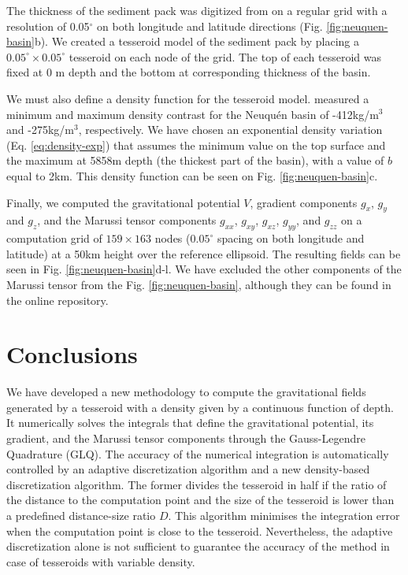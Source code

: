 \documentclass[extra, referee]{gji}
\begin{document}
The thickness of the sediment pack was digitized from \citet{Heine2007} on a regular
grid with a resolution of 0.05$^\circ$ on both longitude and latitude directions
(Fig. \ref{fig:neuquen-basin}b).
We created a tesseroid model of the sediment pack by placing a
$0.05^\circ \times 0.05^\circ$ tesseroid on each node of the grid.
The top of each tesseroid was fixed at 0 m depth and the bottom at corresponding
thickness of the basin.

We must also define a density function for the tesseroid model.
\citet{Sigismondi2012} measured a minimum and maximum density contrast for
the Neuqu\'en basin of -412kg/m$^3$ and -275kg/m$^3$, respectively.
We have chosen an exponential density variation (Eq. \ref{eq:density-exp}) that assumes
the minimum value on the top surface and the maximum at 5858m depth (the thickest part
of the basin), with a value of $b$ equal to 2km.
This density function can be seen on Fig. \ref{fig:neuquen-basin}c.

Finally, we computed the gravitational potential $V$, gradient components $g_x$,
$g_y$ and $g_z$, and the Marussi tensor components $g_{xx}$, $g_{xy}$,
$g_{xz}$, $g_{yy}$, and $g_{zz}$ on a computation grid of $159\times163$ nodes
($0.05^\circ$ spacing on both longitude and latitude) at a 50km height over the
reference ellipsoid.
The resulting fields can be seen in Fig.
\ref{fig:neuquen-basin}d-l.
We have excluded the other components of the Marussi tensor from the Fig.
\ref{fig:neuquen-basin},
although they can be found in the online repository.



\section{Conclusions}

We have developed a new methodology to compute the gravitational fields
generated by a tesseroid with a density given by a continuous function of depth.
It numerically solves the integrals that define the gravitational potential,
its gradient, and the Marussi tensor components through the Gauss-Legendre
Quadrature (GLQ).
The accuracy of the numerical integration is automatically controlled by an adaptive
discretization algorithm and a new density-based discretization algorithm.
The former divides the tesseroid in half if the ratio of the distance to the computation
point and the size of the tesseroid is lower than a predefined distance-size ratio $D$.
This algorithm minimises the integration error when the computation point is close to
the tesseroid.
Nevertheless, the adaptive discretization alone is not sufficient to guarantee the
accuracy of the method in case of tesseroids with variable density.
\end{document}
